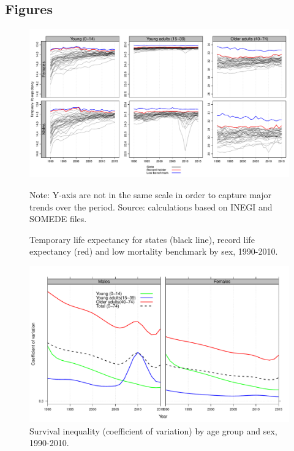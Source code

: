 \documentclass{bmcart}
\begin{document}
\begin{backmatter}

\section*{Figures}

\begin{figure}[h!]
\centering
\caption{Temporary life expectancy for states (black line), record life
expectancy (red) and low mortality benchmark by sex, 1990-2010.}
\label{Fig1}

\includegraphics[scale=.35]{Figure1.pdf}

Note: Y-axis are not in the same scale in order to capture major trends over the period. Source: calculations based on INEGI and SOMEDE files. 
\end{figure}



\begin{figure}[h!]
\centering
\caption{Survival inequality (coefficient of variation) by age group and sex, 1990-2010.}
\label{Fig2}
\includegraphics[scale=.4]{CVfig.pdf}


\end{figure}
\end{backmatter}
\end{document}
